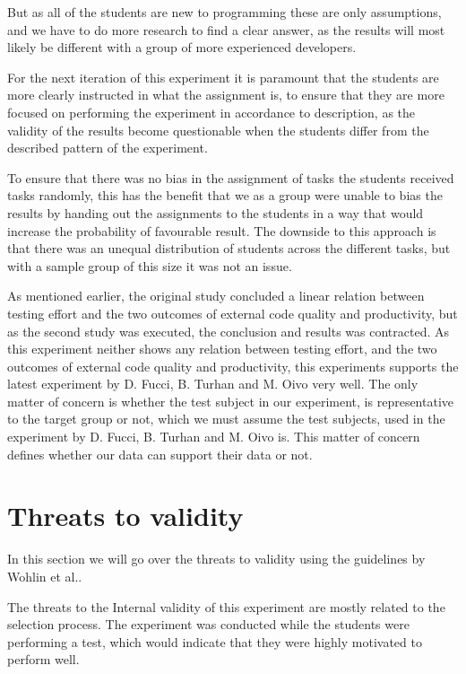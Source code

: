 \documentclass{sig-alternate-05-2015}
\begin{document}
But as all of the students are new to programming these are only assumptions, and we have to do more research to find a clear answer, as the results will most likely be different with a group of more experienced developers.

For the next iteration of this experiment it is paramount that the students are more clearly instructed in what the assignment is, to ensure that they are more focused on performing the experiment in accordance to description, as the validity of the results become questionable when the students differ from the described pattern of the experiment. 

To ensure that there was no bias in the assignment of tasks the students received tasks randomly, this has the benefit that we as a group were unable to bias the results by handing out the assignments to the students in a way that would increase the probability of favourable result. The downside to this approach is that there was an unequal distribution of students across the different tasks, but with a sample group of this size it was not an issue.

As mentioned earlier, the original study concluded a linear relation between testing effort and the two outcomes of external code quality and productivity, but as the second study was executed, the conclusion and results was contracted. As this experiment neither shows any relation between testing effort, and the two outcomes of external code quality and productivity, this experiments supports the latest experiment by D. Fucci, B. Turhan and M. Oivo very well. The only matter of concern is whether the test subject in our experiment, is representative to the target group or not, which we must assume the test subjects, used in the experiment by D. Fucci, B. Turhan and M. Oivo is. This matter of concern defines whether our data can support their data or not.


\section{Threats to validity}
\label{sec:Threats to validity}
In this section we will go over the threats to validity using the guidelines by Wohlin et al.\cite{wohlin1}.

The threats to the Internal validity of this experiment are mostly related to the selection process. The experiment was conducted while the students were performing a test, which would indicate that they were highly motivated to perform well.
\end{document}
